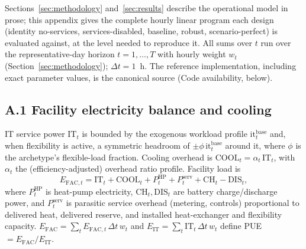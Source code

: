 \documentclass[preprint,12pt]{elsarticle}
\begin{document}
Sections~\ref{sec:methodology} and~\ref{sec:results} describe the operational model in prose; this appendix gives the complete hourly linear program each design (identity no-services, services-disabled, baseline, robust, scenario-perfect) is evaluated against, at the level needed to reproduce it. All sums over $t$ run over the representative-day horizon $t=1,\dots,T$ with hourly weight $w_t$ (Section~\ref{sec:methodology}); $\Delta t=1$~h. The reference implementation, including exact parameter values, is the canonical source (Code availability, below).

\subsection*{A.1 Facility electricity balance and cooling}
IT service power $\text{IT}_t$ is bounded by the exogenous workload profile $\text{it}^{\text{base}}_t$ and, when flexibility is active, a symmetric headroom of $\pm\phi\, \text{it}^{\text{base}}_t$ around it, where $\phi$ is the archetype's flexible-load fraction. Cooling overhead is $\text{COOL}_t=\alpha_t\,\text{IT}_t$, with $\alpha_t$ the (efficiency-adjusted) overhead ratio profile. Facility load is
\begin{equation}
E_{\text{FAC},t} = \text{IT}_t + \text{COOL}_t + P^{\text{HP}}_t + P^{\text{serv}}_t + \text{CH}_t - \text{DIS}_t,
\end{equation}
where $P^{\text{HP}}_t$ is heat-pump electricity, $\text{CH}_t,\text{DIS}_t$ are battery charge/discharge power, and $P^{\text{serv}}_t$ is parasitic service overhead (metering, controls) proportional to delivered heat, delivered reserve, and installed heat-exchanger and flexibility capacity. $E_{\text{FAC}}=\sum_t E_{\text{FAC},t}\,\Delta t\, w_t$ and $E_{\text{IT}}=\sum_t \text{IT}_t\,\Delta t\, w_t$ define PUE $=E_{\text{FAC}}/E_{\text{IT}}$.
\end{document}
